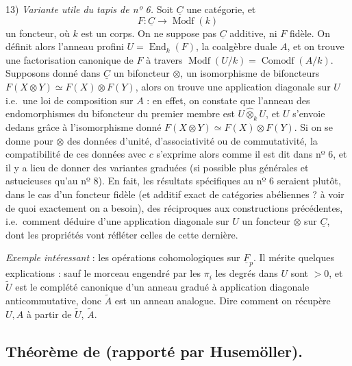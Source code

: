 \documentclass[11pt,a4paper]{article}
\begin{document}

13) \emph{Variante utile du tapis de nº 6.} Soit $\underline{C}$ une catégorie,
et \struck{\ill{}}
\[ F : \underline{C} \longrightarrow \operatorname{Modf}(k) \]
un foncteur, où $k$ est un corps. On ne suppose pas $\underline{C}$ additive, ni
$F$ fidèle. On définit alors l'anneau profini
$U = \operatorname{End}_{k}(F)$, la coalgèbre duale $A$, et on trouve une
factorisation canonique de $F$ à travers
$\operatorname{Modf}(U/k) = \operatorname{Comodf}(A/k)$. Supposons donné dans
$\underline{C}$ un bifoncteur $\otimes$,   un isomorphisme
de bifoncteurs $F(X \otimes Y) \simeq F(X) \otimes F(Y)$, alors on trouve une
application diagonale sur $U$ i.e.\ une loi de composition \struck{\ill{}} sur
$A$ : en effet, on constate que l'anneau des endomorphismes du bifoncteur du
premier membre est $U \mathbin{\widehat{\otimes}}_{k} U$, et $U$ s'envoie dedans
grâce à l'isomorphisme donné $F(X \otimes Y) \simeq F(X) \otimes F(Y)$. Si on se
donne pour $\otimes$ des données d'unité, d'associativité ou de commutativité,
la compatibilité de ces données avec $c$ s'exprime alors comme il est dit dans
nº 6, et il y a lieu de donner
des variantes graduées (si possible plus générales et astucieuses qu'au
nº 8). En fait, les résultats spécifiques au
nº 6 seraient plutôt, dans le cas d'un foncteur fidèle (et
additif \struck{\ill{}} exact de catégories abéliennes ? à voir de quoi
exactement on a besoin), des réciproques aux constructions précédentes, i.e.\
comment déduire d'une application diagonale sur $U$ un foncteur $\otimes$ sur
$\underline{C}$, dont les propriétés vont réfléter celles de cette dernière.

\emph{Exemple intéressant} : les opérations cohomologiques sur
$\underline{F}_{p}$. Il mérite quelques explications : sauf le morceau engendré
par les $\pi_{i}$ \struck{\ill{}} les degrés dans $U$ sont $> 0$, et
$\widetilde{U}$\marginal{$= k + U^{+}$} est le complété canonique d'un anneau
gradué à application diagonale anticommutative, donc $\widetilde{A}$ est un
anneau analogue. Dire comment on récupère $U, A$ à partir de $\widetilde{U}$,
$\widetilde{A}$.


\subsection*{Théorème de \ill{} (rapporté par Husemöller).}
\end{document}
